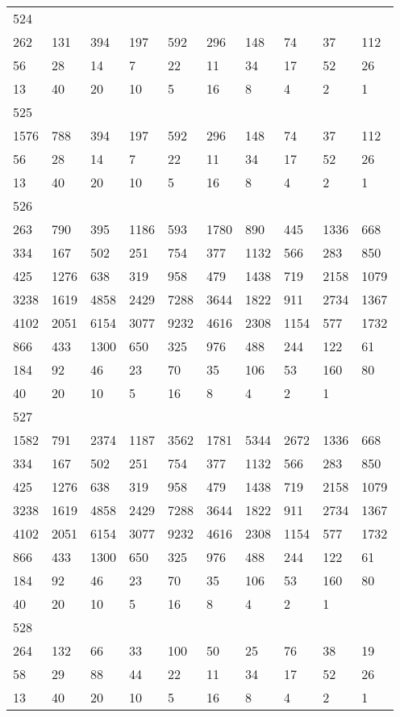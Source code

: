 \begin{longtable}{*{10}{l}}
524&&&&&&&&&\\
262& 131& 394& 197& 592& 296& 148& 74& 37& 112\\
56& 28& 14& 7& 22& 11& 34& 17& 52& 26\\
13& 40& 20& 10& 5& 16& 8& 4& 2& 1\\

525&&&&&&&&&\\
1576& 788& 394& 197& 592& 296& 148& 74& 37& 112\\
56& 28& 14& 7& 22& 11& 34& 17& 52& 26\\
13& 40& 20& 10& 5& 16& 8& 4& 2& 1\\

526&&&&&&&&&\\
263& 790& 395& 1186& 593& 1780& 890& 445& 1336& 668\\
334& 167& 502& 251& 754& 377& 1132& 566& 283& 850\\
425& 1276& 638& 319& 958& 479& 1438& 719& 2158& 1079\\
3238& 1619& 4858& 2429& 7288& 3644& 1822& 911& 2734& 1367\\
4102& 2051& 6154& 3077& 9232& 4616& 2308& 1154& 577& 1732\\
866& 433& 1300& 650& 325& 976& 488& 244& 122& 61\\
184& 92& 46& 23& 70& 35& 106& 53& 160& 80\\
40& 20& 10& 5& 16& 8& 4& 2& 1& \\

527&&&&&&&&&\\
1582& 791& 2374& 1187& 3562& 1781& 5344& 2672& 1336& 668\\
334& 167& 502& 251& 754& 377& 1132& 566& 283& 850\\
425& 1276& 638& 319& 958& 479& 1438& 719& 2158& 1079\\
3238& 1619& 4858& 2429& 7288& 3644& 1822& 911& 2734& 1367\\
4102& 2051& 6154& 3077& 9232& 4616& 2308& 1154& 577& 1732\\
866& 433& 1300& 650& 325& 976& 488& 244& 122& 61\\
184& 92& 46& 23& 70& 35& 106& 53& 160& 80\\
40& 20& 10& 5& 16& 8& 4& 2& 1& \\

528&&&&&&&&&\\
264& 132& 66& 33& 100& 50& 25& 76& 38& 19\\
58& 29& 88& 44& 22& 11& 34& 17& 52& 26\\
13& 40& 20& 10& 5& 16& 8& 4& 2& 1\\


\end{longtable}
